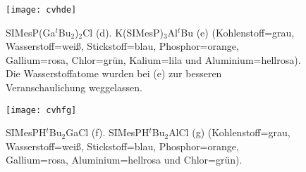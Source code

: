 \begin{figure}[ht!]
	\centering
	\texttt{[image: cvhde]}
	\captionsetup{figurewithin = chapter}
	\captionsetup{font=small, labelfont=bf}\caption[{Abbildung von SIMesP(Ga$^\textit{t}$Bu$_2$)$_2$Cl und K(SIMesP)$_3$Al$^\textit{t}$Bu}]{SIMesP(Ga$^\textit{t}$Bu$_2$)$_2$Cl \textsf{(d)}. K(SIMesP)$_3$Al$^\textit{t}$Bu \textsf{(e)} (Kohlenstoff=grau, Wasserstoff=weiß, Stickstoff=blau, Phosphor=orange, Gallium=rosa, Chlor=grün, Kalium=lila und Aluminium=hellrosa). Die Wasserstoffatome wurden bei \textsf{(e)} zur besseren Veranschaulichung weggelassen.}
\label{abb:cvhde}
\end{figure}

\begin{figure}[ht!]
	\centering
	\texttt{[image: cvhfg]}
	\captionsetup{figurewithin = chapter}
	\captionsetup{font=small, labelfont=bf}\caption[{Abbildung von SIMesPH$^\textit{t}$Bu$_2$GaCl und SIMesPH$^\textit{t}$Bu$_2$AlCl}]{SIMesPH$^\textit{t}$Bu$_2$GaCl \textsf{(f)}. SIMesPH$^\textit{t}$Bu$_2$AlCl \textsf{(g)} (Kohlenstoff=grau, Wasserstoff=weiß, Stickstoff=blau, Phosphor=orange, Gallium=rosa, Aluminium=hellrosa und Chlor=grün).}
\label{abb:cvhfg}
\end{figure}


%
%

